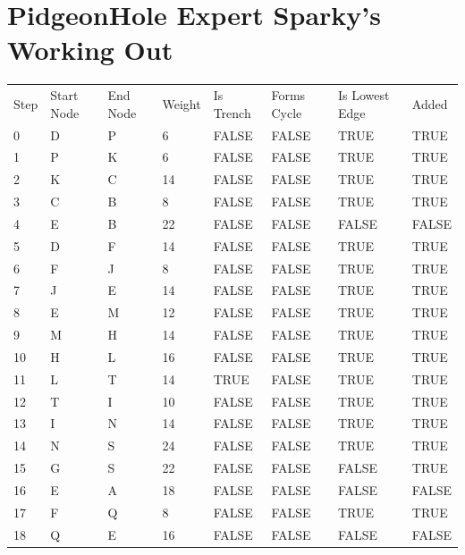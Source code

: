 \documentclass[11pt]{book}
\renewcommand{\=}[1]{\stackrel{#1}{=}} %
\theoremstyle{definition}
\theoremstyle{remark}
\begin{document}
\section{PidgeonHole Expert Sparky's Working Out}
\begin{table}[]
\begin{tabular}{llllllll}
Step & Start Node & End Node & Weight & Is Trench & Forms Cycle & Is Lowest Edge & Added \\
0 & D & P & 6 & FALSE & FALSE & TRUE & \cellcolor[HTML]{9AFF99}TRUE \\
1 & P & K & 6 & FALSE & FALSE & TRUE & \cellcolor[HTML]{9AFF99}TRUE \\
2 & K & C & 14 & FALSE & FALSE & TRUE & \cellcolor[HTML]{9AFF99}TRUE \\
3 & C & B & 8 & FALSE & FALSE & TRUE & \cellcolor[HTML]{9AFF99}TRUE \\
4 & E & B & 22 & FALSE & FALSE & FALSE & \cellcolor[HTML]{FFCCC9}FALSE \\
5 & D & F & 14 & FALSE & FALSE & TRUE & \cellcolor[HTML]{9AFF99}TRUE \\
6 & F & J & 8 & FALSE & FALSE & TRUE & \cellcolor[HTML]{9AFF99}TRUE \\
7 & J & E & 14 & FALSE & FALSE & TRUE & \cellcolor[HTML]{9AFF99}TRUE \\
8 & E & M & 12 & FALSE & FALSE & TRUE & \cellcolor[HTML]{9AFF99}TRUE \\
9 & M & H & 14 & FALSE & FALSE & TRUE & \cellcolor[HTML]{9AFF99}TRUE \\
10 & H & L & 16 & FALSE & FALSE & TRUE & \cellcolor[HTML]{9AFF99}TRUE \\
11 & L & T & 14 & \cellcolor[HTML]{9AFF99}TRUE & FALSE & TRUE & \cellcolor[HTML]{9AFF99}TRUE \\
12 & T & I & 10 & FALSE & FALSE & TRUE & \cellcolor[HTML]{9AFF99}TRUE \\
13 & I & N & 14 & FALSE & FALSE & TRUE & \cellcolor[HTML]{9AFF99}TRUE \\
14 & N & S & 24 & FALSE & FALSE & TRUE & \cellcolor[HTML]{9AFF99}TRUE \\
15 & G & S & 22 & FALSE & FALSE & FALSE & \cellcolor[HTML]{9AFF99}TRUE \\
16 & E & A & 18 & FALSE & FALSE & FALSE & \cellcolor[HTML]{FFCCC9}FALSE \\
17 & F & Q & 8 & FALSE & FALSE & TRUE & \cellcolor[HTML]{9AFF99}TRUE \\
18 & Q & E & 16 & FALSE & FALSE & FALSE & \cellcolor[HTML]{FFCCC9}FALSE \\

\end{tabular}
\end{table}
\end{document}
